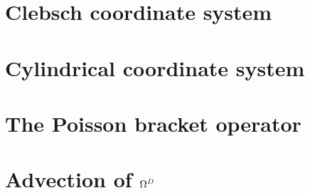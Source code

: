\documentclass[12pt,a4paper,oneside,openright]{report} %
\begin{document}
\chapter{Clebsch coordinate system}
\label{app:Clebsch}


\chapter{Cylindrical coordinate system}
\label{app:cylcoord}


\chapter{The Poisson bracket operator}
\label{app:poisson}


\chapter{Advection of \texorpdfstring{$\Omega^D$}{OmegaD}}
\label{app:vortDAdv}




\end{document}
